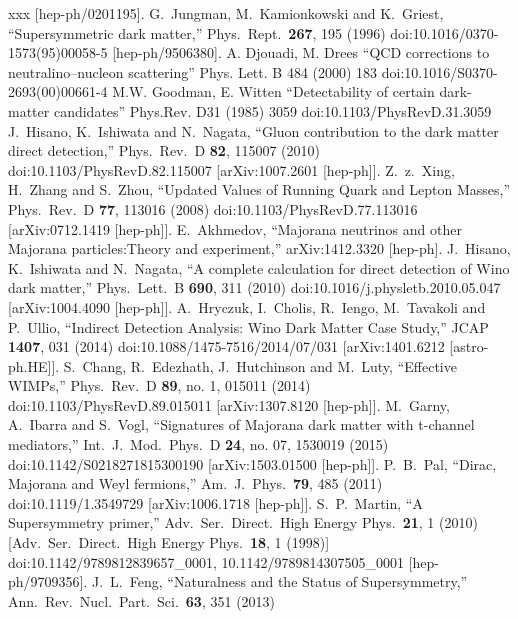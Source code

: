 \begin{thebibliography}{xxx}
  [hep-ph/0201195].
    G.~Jungman, M.~Kamionkowski and K.~Griest,
  ``Supersymmetric dark matter,''
  Phys.\ Rept.\  {\bf 267}, 195 (1996)
  doi:10.1016/0370-1573(95)00058-5
  [hep-ph/9506380]. 
  A. Djouadi, M. Drees ``QCD corrections to neutralino–nucleon scattering'' Phys. Lett. B 484 (2000) 183 doi:10.1016/S0370-2693(00)00661-4
 M.W. Goodman, E. Witten ``Detectability of certain dark-matter candidates'' Phys.Rev. D31 (1985) 3059 doi:10.1103/PhysRevD.31.3059
   J.~Hisano, K.~Ishiwata and N.~Nagata,
  ``Gluon contribution to the dark matter direct detection,''
  Phys.\ Rev.\ D {\bf 82}, 115007 (2010)
  doi:10.1103/PhysRevD.82.115007
  [arXiv:1007.2601 [hep-ph]].
    Z.~z.~Xing, H.~Zhang and S.~Zhou,
  ``Updated Values of Running Quark and Lepton Masses,''
  Phys.\ Rev.\ D {\bf 77}, 113016 (2008)
  doi:10.1103/PhysRevD.77.113016
  [arXiv:0712.1419 [hep-ph]].
    E.~Akhmedov,
  ``Majorana neutrinos and other Majorana particles:Theory and experiment,''
  arXiv:1412.3320 [hep-ph].
    J.~Hisano, K.~Ishiwata and N.~Nagata,
  ``A complete calculation for direct detection of Wino dark matter,''
  Phys.\ Lett.\ B {\bf 690}, 311 (2010)
  doi:10.1016/j.physletb.2010.05.047
  [arXiv:1004.4090 [hep-ph]].
    A.~Hryczuk, I.~Cholis, R.~Iengo, M.~Tavakoli and P.~Ullio,
  ``Indirect Detection Analysis: Wino Dark Matter Case Study,''
  JCAP {\bf 1407}, 031 (2014)
  doi:10.1088/1475-7516/2014/07/031
  [arXiv:1401.6212 [astro-ph.HE]].
    S.~Chang, R.~Edezhath, J.~Hutchinson and M.~Luty,
  ``Effective WIMPs,''
  Phys.\ Rev.\ D {\bf 89}, no. 1, 015011 (2014)
  doi:10.1103/PhysRevD.89.015011
  [arXiv:1307.8120 [hep-ph]].
    M.~Garny, A.~Ibarra and S.~Vogl,
  ``Signatures of Majorana dark matter with t-channel mediators,''
  Int.\ J.\ Mod.\ Phys.\ D {\bf 24}, no. 07, 1530019 (2015)
  doi:10.1142/S0218271815300190
  [arXiv:1503.01500 [hep-ph]].
    P.~B.~Pal,
  ``Dirac, Majorana and Weyl fermions,''
  Am.\ J.\ Phys.\  {\bf 79}, 485 (2011)
  doi:10.1119/1.3549729
  [arXiv:1006.1718 [hep-ph]].
    S.~P.~Martin,
  ``A Supersymmetry primer,''
  Adv.\ Ser.\ Direct.\ High Energy Phys.\  {\bf 21}, 1 (2010)
  [Adv.\ Ser.\ Direct.\ High Energy Phys.\  {\bf 18}, 1 (1998)]
  doi:10.1142/9789812839657\_0001, 10.1142/9789814307505\_0001
  [hep-ph/9709356].
    J.~L.~Feng,
  ``Naturalness and the Status of Supersymmetry,''
  Ann.\ Rev.\ Nucl.\ Part.\ Sci.\  {\bf 63}, 351 (2013)

\end{thebibliography}
